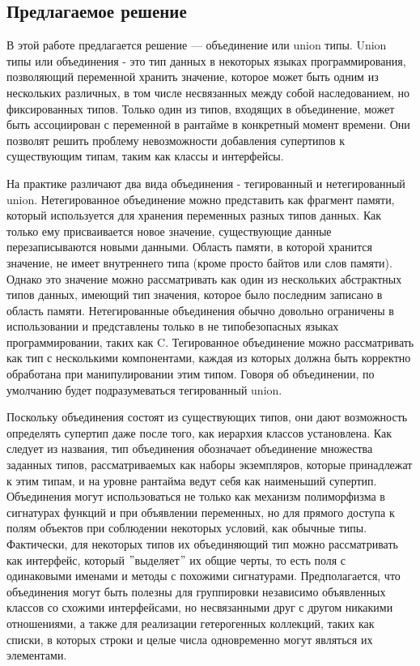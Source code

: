 \subsection{Предлагаемое решение}

В этой работе предлагается решение — объединение или union типы.
Union типы или объединения - это тип данных в некоторых языках программирования, позволяющий
переменной хранить значение, которое может быть одним из нескольких различных, в том числе
несвязанных между собой наследованием, но фиксированных типов.
Только один из типов, входящих в объединение, может быть ассоциирован с переменной в рантайме в
конкретный момент времени.
Они позволят решить проблему невозможности добавления супертипов к существующим типам, таким как классы и интерфейсы.

На практике различают два вида объединения - тегированный и нетегированный union.
Нетегированное объединение можно представить как фрагмент памяти, который используется для хранения переменных разных
типов данных.
Как только ему присваивается новое значение, существующие данные перезаписываются новыми данными.
Область памяти, в которой хранится значение, не имеет внутреннего типа (кроме просто байтов или слов памяти).
Однако это значение можно рассматривать как один из нескольких абстрактных типов данных, имеющий тип значения,
которое было последним записано в область памяти.
Нетегированные объединения обычно довольно ограничены в использовании и представлены только в не типобезопасных языках
программировании, таких как C\@.
Тегированное объединение можно рассматривать как тип с несколькими компонентами, каждая из которых должна быть
корректно обработана при манипулировании этим типом.
Говоря об объединении, по умолчанию будет подразумеваться тегированный union.

Поскольку объединения состоят из существующих типов, они дают возможность определять супертип даже после того,
как иерархия классов установлена.
Как следует из названия, тип объединения обозначает объединение множества заданных типов, рассматриваемых как наборы
экземпляров, которые принадлежат к этим типам, и на уровне рантайма ведут себя как наименьший супертип.
Объединения могут использоваться не только как механизм полиморфизма в сигнатурах функций и при объявлении переменных,
но для прямого доступа к полям объектов при соблюдении некоторых условий, как обычные типы.
Фактически, для некоторых типов их объединяющий тип можно рассматривать как интерфейс,
который \("\)выделяет\("\) их общие черты, то есть поля с одинаковыми именами и методы с похожими сигнатурами.
Предполагается, что объединения могут быть полезны для группировки независимо объявленных классов со схожими
интерфейсами, но несвязанными друг с другом никакими отношениями, а также для реализации гетерогенных коллекций,
таких как списки, в которых строки и целые числа одновременно могут являться их элементами.

